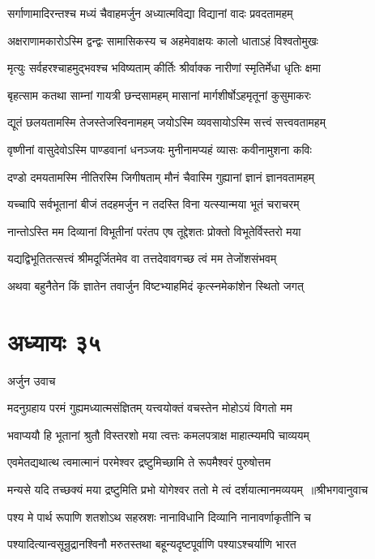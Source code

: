 \twolineshloka
{सर्गाणामादिरन्तश्च मध्यं चैवाहमर्जुन}
{अध्यात्मविद्या विद्यानां वादः प्रवदतामहम्}


\twolineshloka
{अक्षराणामकारोऽस्मि द्वन्द्वः सामासिकस्य च}
{अहमेवाक्षयः कालो धाताऽहं विश्वतोमुखः}


\twolineshloka
{मृत्युः सर्वहरश्चाहमुद्भवश्च भविष्यताम्}
{कीर्तिः श्रीर्वाक्क नारीणां स्मृतिर्मेधा धृतिः क्षमा}


\twolineshloka
{बृहत्साम कतथा साम्नां गायत्री छन्दसामहम्}
{मासानां मार्गशीर्षोऽहमृतूनां कुसुमाकरः}


\twolineshloka
{द्यूतं छलयतामस्मि तेजस्तेजस्विनामहम्}
{जयोऽस्मि व्यवसायोऽस्मि सत्त्वं सत्त्ववतामहम्}


\twolineshloka
{वृष्णीनां वासुदेवोऽस्मि पाण्डवानां धनञ्जयः}
{मुनीनामप्यहं व्यासः कवीनामुशना कविः}


\twolineshloka
{दण्डो दमयतामस्मि नीतिरस्मि जिगीषताम्}
{मौनं चैवास्मि गुह्यानां ज्ञानं ज्ञानवतामहम्}


\twolineshloka
{यच्चापि सर्वभूतानां बीजं तदहमर्जुन}
{न तदस्ति विना यत्स्यान्मया भूतं चराचरम्}


\twolineshloka
{नान्तोऽस्ति मम दिव्यानां विभूतीनां परंतप}
{एष तूद्देशतः प्रोक्तो विभूतेर्विस्तरो मया}


\twolineshloka
{यद्यद्विभूतितत्सत्त्वं श्रीमदूर्जितमेव वा}
{तत्तदेवावगच्छ त्वं मम तेजोंशसंभवम्}


\twolineshloka
{अथवा बहुनैतेन किं ज्ञातेन तवार्जुन}
{विष्टभ्याहमिदं कृत्स्नमेकांशेन स्थितो जगत्}


\chapter{अध्यायः ३५}
\twolineshloka
{अर्जुन उवाच}
{}


\twolineshloka
{मदनुग्रहाय परमं गुह्यमध्यात्मसंज्ञितम्}
{यत्त्वयोक्तं वचस्तेन मोहोऽयं विगतो मम}


\twolineshloka
{भवाप्ययौ हि भूतानां श्रुतौ विस्तरशो मया}
{त्वत्तः कमलपत्राक्ष माहात्म्यमपि चाव्ययम्}


\twolineshloka
{एवमेतद्यथात्थ त्वमात्मानं परमेश्वर}
{द्रष्टुमिच्छामि ते रूपमैश्वरं पुरुषोत्तम}


\threelineshloka
{मन्यसे यदि तच्छक्यं मया द्रष्टुमिति प्रभो}
{योगेश्वर ततो मे त्वं दर्शयात्मानमव्ययम् ॥श्रीभगवानुवाच}
{}


\twolineshloka
{पश्य मे पार्थ रूपाणि शतशोऽथ सहस्रशः}
{नानाविधानि दिव्यानि नानावर्णाकृतीनि च}


\twolineshloka
{पश्यादित्यान्वसून्रुद्रानश्विनौ मरुतस्तथा}
{बहून्यदृष्टपूर्वाणि पश्याऽश्चर्याणि भारत}


